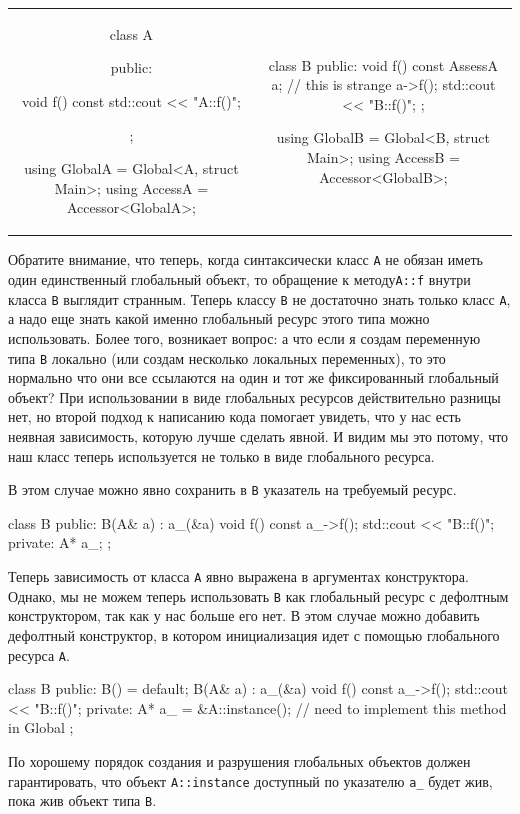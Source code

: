 \begin{center}
\begin{tabular}{cc}
{
\begin{minipage}[\baselineskip]{8cm}
\begin{cppcode}[numbers=none]
class A {
public:

  void f() const {
    std::cout << "A::f()\n";
  }
};


using GlobalA = Global<A, struct Main>;
using AccessA = Accessor<GlobalA>;
\end{cppcode}
\end{minipage}
}&{
\begin{minipage}[\baselineskip]{8cm}
\begin{cppcode}[numbers=none]
class B {
public:
  void f() const {
    AssessA a;  // this is strange
    a->f();
    std::cout << "B::f()\n";
  }
};

using GlobalB = Global<B, struct Main>;
using AccessB = Accessor<GlobalB>;
\end{cppcode}
\end{minipage}
}\\
\end{tabular}
\end{center}
Обратите внимание, что теперь, когда синтаксически класс \verb"A" не обязан иметь один единственный глобальный объект, то обращение к методу\verb"A::f" внутри класса \verb"B" выглядит странным.
Теперь классу \verb"B" не достаточно знать только класс \verb"A", а надо еще знать какой именно глобальный ресурс этого типа можно использовать.
Более того, возникает вопрос: а что если я создам переменную типа \verb"B" локально (или создам несколько локальных переменных), то это нормально что они все ссылаются на один и тот же фиксированный глобальный объект?
При использовании в виде глобальных ресурсов действительно разницы нет, но второй подход к написанию кода помогает увидеть, что у нас есть неявная зависимость, которую лучше сделать явной.
И видим мы это потому, что наш класс теперь используется не только в виде глобального ресурса.

В этом случае можно явно сохранить в \verb"B" указатель на требуемый ресурс.
\begin{cppcode}
class B {
public:
  B(A& a) : a_(&a) {}
  void f() const {
    a_->f();
    std::cout << "B::f()\n";
  }
private:
  A* a_;
};
\end{cppcode}
Теперь зависимость от класса \verb"A" явно выражена в аргументах конструктора.
Однако, мы не можем теперь использовать \verb"B" как глобальный ресурс с дефолтным конструктором, так как у нас больше его нет.
В этом случае можно добавить дефолтный конструктор, в котором инициализация идет с помощью глобального ресурса \verb"A".
\begin{cppcode}
class B {
public:
  B() = default;
  B(A& a) : a_(&a) {}
  void f() const {
    a_->f();
    std::cout << "B::f()\n";
  }
private:
  A* a_ = &A::instance(); // need to implement this method in Global
};
\end{cppcode}
По хорошему порядок создания и разрушения глобальных объектов должен гарантировать, что объект \verb"A::instance" доступный по указателю \verb"a_" будет жив, пока жив объект типа \verb"B".


